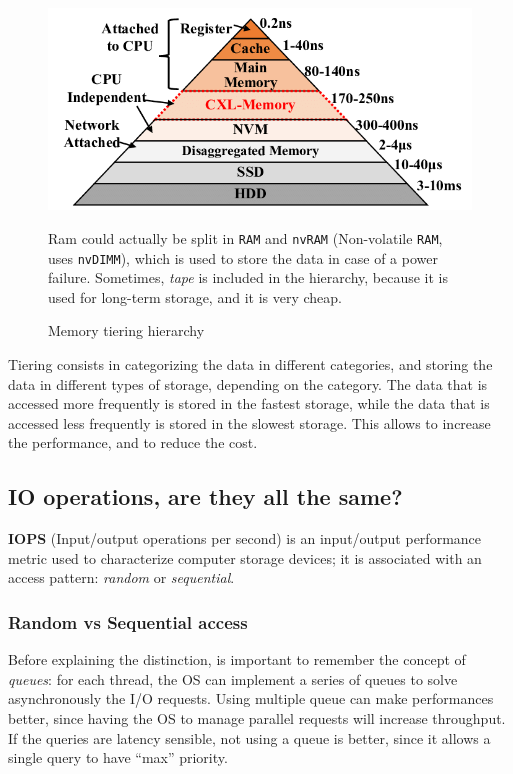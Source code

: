 \begin{figure}[htbp]
   \centering
   \includegraphics{images/tiering_memory.png}
   \caption{Memory tiering hierarchy}
   Ram could actually be split in \texttt{RAM} and \texttt{nvRAM} (Non-volatile \texttt{RAM}, uses \texttt{nvDIMM}), which is used to store the data in case of a power failure.
   Sometimes, \textit{tape} is included in the hierarchy, because it is used for long-term storage, and it is very cheap.
   \label{fig:tiering_memory}
\end{figure}

Tiering consists in categorizing the data in different categories, and storing the data in different types of storage, depending on the category. The data that is accessed more frequently is stored in the fastest storage, while the data that is accessed less frequently is stored in the slowest storage. This allows to increase the performance, and to reduce the cost. 

\subsection{IO operations, are they all the same?}
\textbf{IOPS} (Input/output operations per second) is an input/output
performance metric used to characterize computer storage devices; it is associated with an access pattern: \textit{random} or \textit{sequential}.

\subsubsection{Random vs Sequential access}

Before explaining the distinction, is important to remember the concept of \textit{queues}: for each thread, the OS can implement a series of queues to solve asynchronously the I/O requests. Using multiple queue can make performances better, since having
the OS to manage parallel requests will increase throughput.
If the queries are latency sensible, not using a queue is better, since
it allows a single query to have ``max'' priority.

